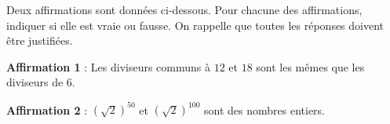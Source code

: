 
\medskip 

Deux affirmations sont données ci-dessous. Pour chacune des affirmations, indiquer si elle est vraie ou fausse. On rappelle que toutes les réponses doivent être justifiées.

\medskip
 
\textbf{Affirmation 1} : Les diviseurs communs à $12$ et $18$ sont les mêmes que les diviseurs de $6$. 

\textbf{Affirmation 2} : $\left(\sqrt{2}\right)^{50}$ 	et $\left(\sqrt{2}\right)^{100}$ 	sont des nombres entiers. 

\bigskip

